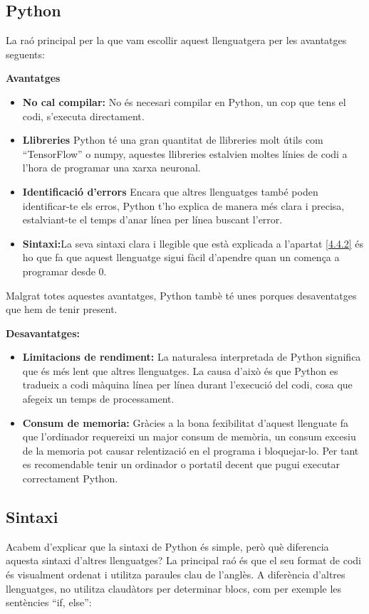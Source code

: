 \subsection{Python}
La raó principal per la que vam escollir aquest llenguatgera per les avantatges seguents:

\textbf{Avantatges}
\begin{itemize}
 \item \textbf{No cal compilar:} No és necesari compilar en Python, un cop que tens el codi, s'executa directament.
 \item \textbf{Llibreries} Python té una gran quantitat de llibreries molt útils com ``TensorFlow'' o numpy, aquestes llibreries estalvien moltes línies de codi a l'hora de programar una xarxa neuronal.
 \item \textbf{Identificació d'errors} Encara que altres llenguatges també poden identificar-te els erros, Python t'ho explica de manera més clara i precisa, estalviant-te el temps d'anar línea per línea buscant l'error.
 \item \textbf{Sintaxi:}La seva sintaxi clara i llegible que està explicada a l'apartat \ref{4.4.2} és ho que fa que aquest llenguatge sigui fàcil d'apendre quan un comença a programar desde 0.
\end{itemize}

Malgrat totes aquestes avantatges, Python tambè té unes porques desaventatges que hem de tenir present.

\textbf{Desavantatges:}
\begin{itemize}
 \item \textbf{Limitacions de rendiment:} La naturalesa interpretada de Python significa que és més lent que altres llenguatges. La causa d'això és que Python es tradueix a codi màquina línea per línea durant l'execució del codi, cosa que afegeix un temps de processament.
 \item \textbf{Consum de memoria:} Gràcies a la bona fexibilitat d'aquest llenguate fa que l'ordinador requereixi un major consum de memòria, un consum excesiu de la memoria pot causar relentizació en el programa i bloquejar-lo. Per tant es recomendable tenir un ordinador o portatil decent que pugui executar correctament Python.
\end{itemize}

\subsection{Sintaxi}
Acabem d'explicar que la sintaxi de Python és simple, però què diferencia aquesta sintaxi d'altres llenguatges? La principal raó és que el seu format de codi és visualment ordenat i utilitza paraules clau de l'anglès. A diferència d'altres llenguatges, no utilitza claudàtors per determinar blocs, com per exemple les sentències ``if, else'':


